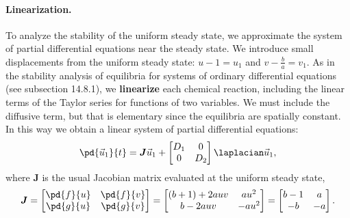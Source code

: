 \paragraph{Linearization.}
To analyze the stability of the uniform steady state, we approximate the system of partial differential equations near the steady state. We introduce small displacements from the uniform steady state: $u - 1 = u_1$ and $v - \frac{b}{a} = v_1$. As in the stability analysis of equilibria for systems of ordinary differential equations (see subsection 14.8.1), we \textbf{linearize} each chemical reaction, including the linear terms of the Taylor series for functions of two variables. We must include the diffusive term, but that is elementary since the equilibria are spatially constant. In this way we obtain a linear system of partial differential equations:
\begin{equation}
\pd{\vec{u}_1}{t} = \boldsymbol{J}\vec{u}_1 + \begin{bmatrix} D_1 & 0 \\ 0 & D_2 \end{bmatrix}\laplacian\vec{u}_1,
\label{eq:14.8.56}
\end{equation}
where $\boldsymbol{J}$ is the usual Jacobian matrix evaluated at the uniform steady state,
\begin{equation}
\boldsymbol{J} = \begin{bmatrix} \pd{f}{u} & \pd{f}{v} \\ \pd{g}{u} & \pd{g}{v} \end{bmatrix} = \begin{bmatrix} (b+1) + 2auv & au^2 \\ b - 2auv & -au^2 \end{bmatrix} = \begin{bmatrix} b-1 & a \\ -b & -a \end{bmatrix}.
\label{eq:14.8.57}
\end{equation}

